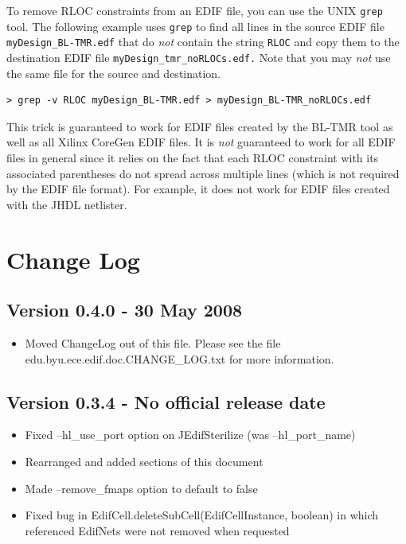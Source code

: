 \documentclass[english]{article}
\begin{document}
To remove RLOC constraints from an EDIF file, you can use the UNIX 
\texttt{grep} tool. The following example uses \texttt{grep} to find all lines 
in the source EDIF file \texttt{myDesign\_BL-TMR.edf} that do \emph{not} contain 
the string \texttt{RLOC} and copy them to the destination EDIF file 
\texttt{myDesign\_tmr\_noRLOCs.edf.} Note that you may \emph{not} use the same 
file for the source and destination.

\begin{verbatim}
> grep -v RLOC myDesign_BL-TMR.edf > myDesign_BL-TMR_noRLOCs.edf
\end{verbatim}

This trick is guaranteed to work for EDIF files created by the BL-TMR tool as 
well as all Xilinx CoreGen EDIF files. It is \emph{not} guaranteed to work for 
all EDIF files in general since it relies on the fact that each RLOC constraint 
with its associated parentheses do not spread across multiple lines (which is 
not required by the EDIF file format). For example, it does not work for EDIF 
files created with the JHDL netlister.

\section{Change Log}

\subsection*{Version 0.4.0 - 30 May 2008}
\begin{itemize}
\item Moved ChangeLog out of this file. Please see the file
edu.byu.ece.edif.doc.CHANGE\_LOG.txt for more information.
\end{itemize}

\subsection*{Version 0.3.4 - No official release date}
\begin{itemize}
\item Fixed --hl\_use\_port option on JEdifSterilize (was --hl\_port\_name)
\item Rearranged and added sections of this document
\item Made –remove\_fmaps option to default to false
\item Fixed bug in EdifCell.deleteSubCell(EdifCellInstance, boolean) in 
which referenced EdifNets were not removed when requested
\end{itemize}
\end{document}
